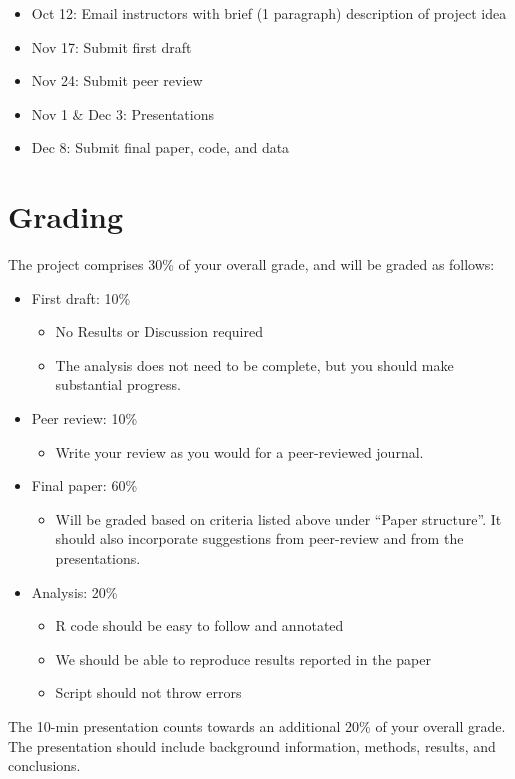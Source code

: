 \documentclass[12pt]{article}
\begin{document}
\begin{itemize}
  \item Oct 12: Email instructors with brief (1 paragraph) description
    of project idea
  \item Nov 17: Submit first draft
  \item Nov 24: Submit peer review
  \item Nov 1 \& Dec 3: Presentations
  \item Dec 8: Submit final paper, code, and data
\end{itemize}


\section*{Grading}

The project comprises 30\% of your overall grade, and will be graded as follows:

\begin{itemize}
  \item First draft: 10\%
    \begin{itemize}
      \item No Results or Discussion required
      \item The analysis does not need to be complete, but you should make substantial progress.
    \end{itemize}
  \item Peer review: 10\%
    \begin{itemize}
      \item Write your review as you would for a peer-reviewed journal.
    \end{itemize}
  \item Final paper: 60\%
    \begin{itemize}
      \item Will be graded based on criteria listed above under
        ``Paper structure''. It should also incorporate suggestions from
        peer-review and from the presentations.
    \end{itemize}
  \item Analysis: 20\%
    \begin{itemize}
      \item R code should be easy to follow and annotated
      \item We should be able to reproduce results reported in the paper
      \item Script should not throw errors
    \end{itemize}
\end{itemize}

The 10-min presentation counts towards an additional 20\% of your
overall grade. The presentation should include background information,
methods, results, and conclusions.   
\end{document}
